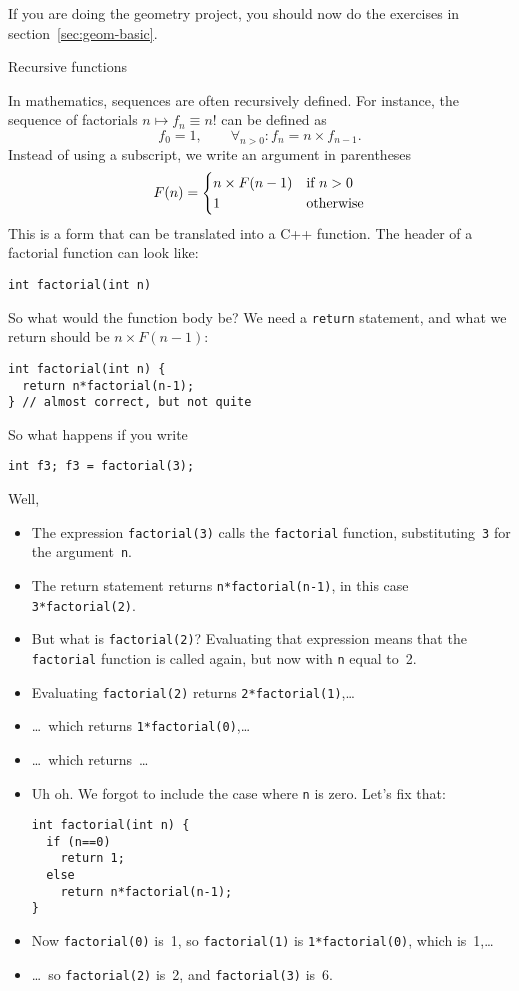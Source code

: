 \begin{exercise}
  \label{ex:geom-basic}
  If you are doing the geometry project, you should now do the exercises
  in section~\ref{sec:geom-basic}.
\end{exercise}

 {Recursive functions}
\label{sec:recursion}

In mathematics, sequences are often recursively defined. For instance,
the sequence of factorials $n\mapsto f_n\equiv n!$ can be defined as
\[ f_0=1,\qquad \forall_{n>0}\colon f_n=n\times f_{n-1}. \]
Instead of using a subscript, we write an argument in parentheses
%
\[ F(n) = 
\begin{cases}
  n \times F(n-1) & \hbox{if $n>0$} \\
  1 &\hbox{otherwise} 
\end{cases}
\]
%
This is a form that can be translated into a C++ function.
The header of a factorial function can look like:
\begin{lstlisting}
int factorial(int n)
\end{lstlisting}
So what would the
function body be? We need a \lstinline{return} statement, and what we return
should be $n \times F(n-1)$:
\begin{lstlisting}
int factorial(int n) {
  return n*factorial(n-1);
} // almost correct, but not quite
\end{lstlisting}
So what happens if you write
\begin{lstlisting}
int f3; f3 = factorial(3);
\end{lstlisting}
Well,
\begin{itemize}
\item The expression \lstinline{factorial(3)} calls the \lstinline{factorial}
  function, substituting~\lstinline{3} for the argument~\lstinline{n}.
\item The return statement returns \lstinline{n*factorial(n-1)}, in this case
  \lstinline{3*factorial(2)}.
\item But what is \lstinline{factorial(2)}? Evaluating that expression means
  that the \lstinline{factorial} function is called again, but now with \lstinline{n}
  equal to~2.
\item Evaluating \lstinline{factorial(2)} returns \lstinline{2*factorial(1)},\ldots
\item \ldots~which returns \lstinline{1*factorial(0)},\ldots
\item \ldots~which returns~\ldots
\item Uh oh. We forgot to include the case where \lstinline{n} is zero. Let's
  fix that:
\begin{lstlisting}
int factorial(int n) {
  if (n==0)
    return 1;
  else
    return n*factorial(n-1);
}
\end{lstlisting}
\item Now \lstinline{factorial(0)} is~1, so \lstinline{factorial(1)} is
  \lstinline{1*factorial(0)}, which is~1,\ldots
\item \ldots~so \lstinline{factorial(2)} is~2, and \lstinline{factorial(3)} is~6.
\end{itemize}

